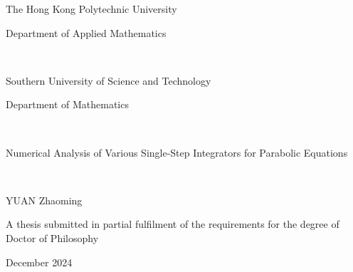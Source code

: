 \thispagestyle{empty}
\begin{center}
\huge

The Hong Kong Polytechnic University


Department of Applied Mathematics

~

Southern University of Science and Technology


Department of Mathematics

~

Numerical Analysis of Various Single-Step Integrators for Parabolic Equations

~

YUAN Zhaoming


A thesis submitted in partial fulfilment of the requirements for the degree of Doctor of Philosophy

December 2024
\end{center}